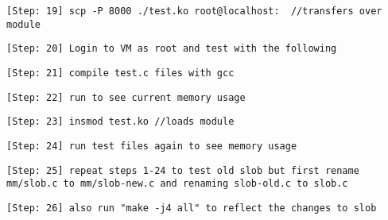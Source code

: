 \documentclass[10pt,letterpaper,draftclsnofoot,onecolumn]{IEEEtran}
\begin{document}
\begin{description}
\item \texttt{[Step: 19] scp -P 8000 ./test.ko root@localhost:~ \newline //transfers over module}
\item \texttt{[Step: 20] Login to VM as root and test with the following}
\item \texttt{[Step: 21] compile test.c files with gcc}
\item \texttt{[Step: 22] run to see current memory usage}
\item \texttt{[Step: 23] insmod test.ko \newline //loads module}
\item \texttt{[Step: 24] run test files again to see memory usage}
\item \texttt{[Step: 25] repeat steps 1-24 to test old slob but first rename mm/slob.c to mm/slob-new.c and renaming slob-old.c to slob.c}
\item \texttt{[Step: 26] also run "make -j4 all" to reflect the changes to slob}
\end{description}



\end{document}
